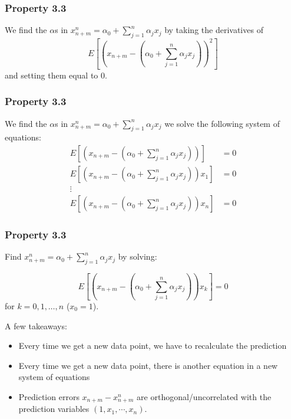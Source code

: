 \documentclass[%
xcolor=pdftex]{beamer}
\begin{document}
\begin{frame}
\frametitle{Property 3.3}

We find the $\alpha$s in $x_{n+m}^n = \alpha_0 + \sum_{j=1}^n \alpha_j x_j$ by taking the derivatives of 
$$
E\left[ \left(x_{n+m} - \left( \alpha_0 + \sum_{j=1}^n \alpha_j x_j\right) \right)^2\right]
$$
and setting them equal to $0$.


\end{frame}


\begin{frame}
\frametitle{Property 3.3}

We find the $\alpha$s in $x_{n+m}^n = \alpha_0 + \sum_{j=1}^n \alpha_j x_j$ we solve the following system of equations: 
\begin{align*}
E\left[ \left(x_{n+m} - \left( \alpha_0 + \sum_{j=1}^n \alpha_j x_j\right) \right) \right] &= 0 \\
E\left[ \left(x_{n+m} - \left( \alpha_0 + \sum_{j=1}^n \alpha_j x_j\right) \right)x_1 \right] &= 0 \\
\vdots&\\
E\left[ \left(x_{n+m} - \left( \alpha_0 + \sum_{j=1}^n \alpha_j x_j\right) \right)x_n \right] &= 0
\end{align*}
\end{frame}


\begin{frame}
\frametitle{Property 3.3}

Find $x_{n+m}^n = \alpha_0 + \sum_{j=1}^n \alpha_j x_j$ by solving: 

$$
E\left[ \left(x_{n+m} - \left( \alpha_0 + \sum_{j=1}^n \alpha_j x_j\right) \right)x_k \right] = 0 
$$
for $k=0,1,\ldots, n$ ($x_0 = 1$).

A few takeaways:

\begin{itemize}
\item Every time we get a new data point, we have to recalculate the prediction
\item Every time we get a new data point, there is another equation in a new system of equations
\item Prediction errors $x_{n+m} - x_{n+m}^n$ are orthogonal/uncorrelated with the prediction variables $(1,x_1, \cdots, x_n)$.
\end{itemize}

\end{frame}
\end{document}
